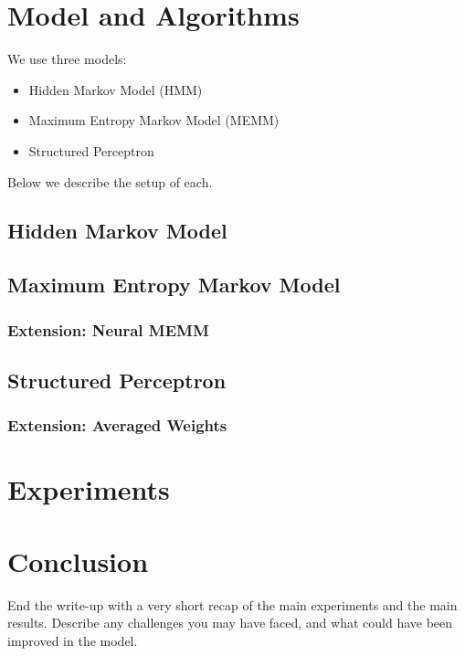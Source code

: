 \documentclass[11pt]{article}
\begin{document}
\section{Model and Algorithms}

We use three models:
\begin{itemize}
  \item Hidden Markov Model (HMM)
  \item Maximum Entropy Markov Model (MEMM)
  \item Structured Perceptron
\end{itemize}

Below we describe the setup of each. 

\subsection{Hidden Markov Model}

\subsection{Maximum Entropy Markov Model}

\subsubsection{Extension: Neural MEMM}

\subsection{Structured Perceptron}

\subsubsection{Extension: Averaged Weights}

\section{Experiments}


\section{Conclusion}

End the write-up with a very short recap of the main experiments and the main results. Describe any challenges you may have faced, and what could have been improved in the model.



\end{document}
